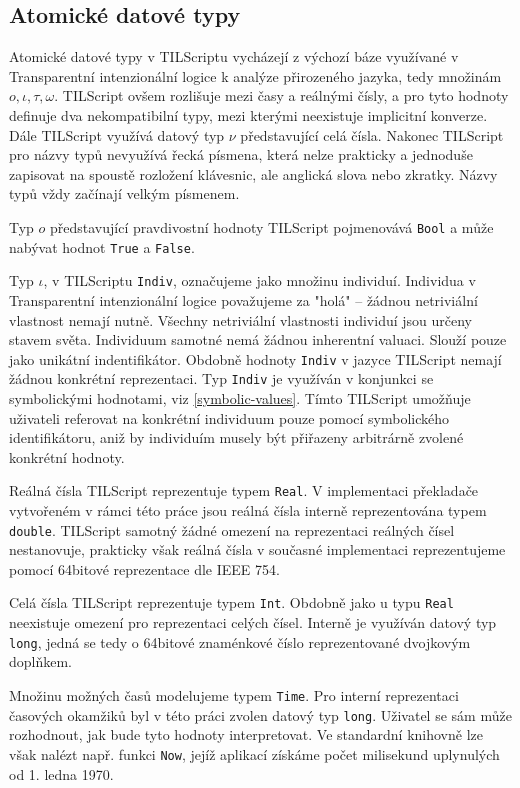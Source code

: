 \subsection{Atomické datové typy}

Atomické datové typy v TILScriptu vycházejí z výchozí báze využívané v Transparentní intenzionální
logice k analýze přirozeného jazyka, tedy množinám ${o, \iota, \tau, \omega}$. TILScript ovšem
rozlišuje mezi časy a reálnými čísly, a pro tyto hodnoty definuje dva nekompatibilní typy, mezi
kterými neexistuje implicitní konverze. Dále TILScript využívá datový typ $\nu$ představující celá
čísla. Nakonec TILScript pro názvy typů nevyužívá řecká písmena, která nelze prakticky a jednoduše
zapisovat na spoustě rozložení klávesnic, ale anglická slova nebo zkratky. Názvy typů vždy začínají
velkým písmenem.

Typ $o$ představující pravdivostní hodnoty TILScript pojmenovává \lstinline{Bool} a může nabývat
hodnot \lstinline{True} a \lstinline{False}.

Typ $\iota$, v TILScriptu \lstinline{Indiv}, označujeme jako množinu individuí. Individua
v Transparentní intenzionální logice považujeme za "holá" -- žádnou netriviální vlastnost nemají
nutně. Všechny netriviální vlastnosti individuí jsou určeny stavem světa. Individuum samotné nemá
žádnou inherentní valuaci. Slouží pouze jako unikátní indentifikátor. Obdobně hodnoty
\lstinline{Indiv} v jazyce TILScript nemají žádnou konkrétní reprezentaci. Typ \lstinline{Indiv}
je využíván v konjunkci se symbolickými hodnotami, viz \ref{symbolic-values}. Tímto TILScript
umožňuje uživateli referovat na konkrétní individuum pouze pomocí symbolického identifikátoru,
aniž by individuím musely být přiřazeny arbitrárně zvolené konkrétní hodnoty.

Reálná čísla TILScript reprezentuje typem \lstinline{Real}. V implementaci překladače vytvořeném
v rámci této práce jsou reálná čísla interně reprezentována typem \lstinline{double}. TILScript
samotný žádné omezení na reprezentaci reálných čísel nestanovuje, prakticky však reálná čísla
v současné implementaci reprezentujeme pomocí 64bitové reprezentace dle IEEE 754.

Celá čísla TILScript reprezentuje typem \lstinline{Int}. Obdobně jako u typu \lstinline{Real}
neexistuje omezení pro reprezentaci celých čísel. Interně je využíván datový typ \lstinline{long},
jedná se tedy o 64bitové znaménkové číslo reprezentované dvojkovým doplňkem.

Množinu možných časů modelujeme typem \lstinline{Time}. Pro interní reprezentaci časových okamžiků
byl v této práci zvolen datový typ \lstinline{long}. Uživatel se sám může rozhodnout, jak bude tyto
hodnoty interpretovat. Ve standardní knihovně lze však nalézt např. funkci \lstinline{Now}, jejíž
aplikací získáme počet milisekund uplynulých od 1. ledna 1970.

